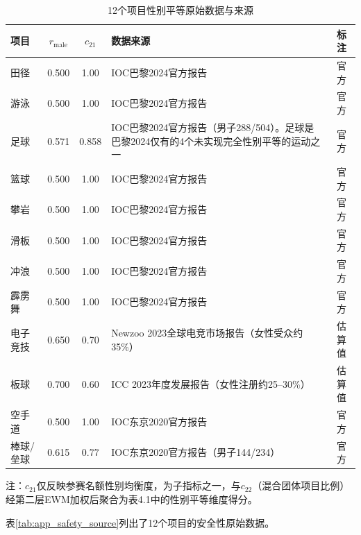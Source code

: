 \documentclass[twoside]{CUGThesis}
\begin{document}
\begin{table}[htbp]
\centering
\small
\caption{12个项目性别平等原始数据与来源}
\label{tab:app_gender_source}
\begin{tabularx}{\textwidth}{lcc>{\raggedright\arraybackslash}Xc}
\toprule
项目 & $r_{\text{male}}$ & $c_{21}$ & 数据来源 & 标注 \\
\midrule
田径 & 0.500 & 1.00 & IOC巴黎2024官方报告 & 官方 \\
游泳 & 0.500 & 1.00 & IOC巴黎2024官方报告 & 官方 \\
足球 & 0.571 & 0.858 & IOC巴黎2024官方报告（男子288/504）。足球是巴黎2024仅有的4个未实现完全性别平等的运动之一 & 官方 \\
篮球 & 0.500 & 1.00 & IOC巴黎2024官方报告 & 官方 \\
攀岩 & 0.500 & 1.00 & IOC巴黎2024官方报告 & 官方 \\
滑板 & 0.500 & 1.00 & IOC巴黎2024官方报告 & 官方 \\
冲浪 & 0.500 & 1.00 & IOC巴黎2024官方报告 & 官方 \\
霹雳舞 & 0.500 & 1.00 & IOC巴黎2024官方报告 & 官方 \\
电子竞技 & 0.650 & 0.70 & Newzoo 2023全球电竞市场报告（女性受众约35\%） & 估算值 \\
板球 & 0.700 & 0.60 & ICC 2023年度发展报告（女性注册约25--30\%） & 估算值 \\
空手道 & 0.500 & 1.00 & IOC东京2020官方报告 & 官方 \\
棒球/垒球 & 0.615 & 0.77 & IOC东京2020官方报告（男子144/234） & 官方 \\
\bottomrule
\end{tabularx}

\smallskip
\footnotesize 注：$c_{21}$仅反映参赛名额性别均衡度，为子指标之一，与$c_{22}$（混合团体项目比例）经第二层EWM加权后聚合为表4.1中的性别平等维度得分。
\end{table}

表\ref{tab:app_safety_source}列出了12个项目的安全性原始数据。
\end{document}
